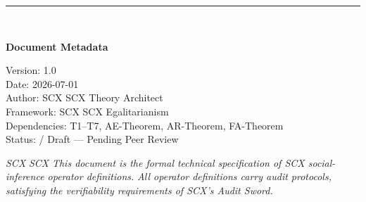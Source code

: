 \documentclass[11pt,a4paper]{article}
\theoremstyle{definition}
\begin{document}
\vfill
\begin{center}
\rule{0.5\textwidth}{0.4pt}\\[8pt]
{\small
\textbf{ Document Metadata}

 Version: 1.0 \\
 Date: 2026-07-01 \\
 Author: SCX  SCX Theory Architect \\
 Framework: SCX  SCX Egalitarianism \\
 Dependencies: T1--T7, AE-Theorem, AR-Theorem, FA-Theorem \\
 Status:  / Draft —  Pending Peer Review

\medskip
\textit{SCX}
\textit{SCX}
\textit{This document is the formal technical specification of SCX social-inference operator definitions.}
\textit{All operator definitions carry audit protocols, satisfying the verifiability requirements of SCX's Audit Sword.}
}
\end{center}
\end{document}
